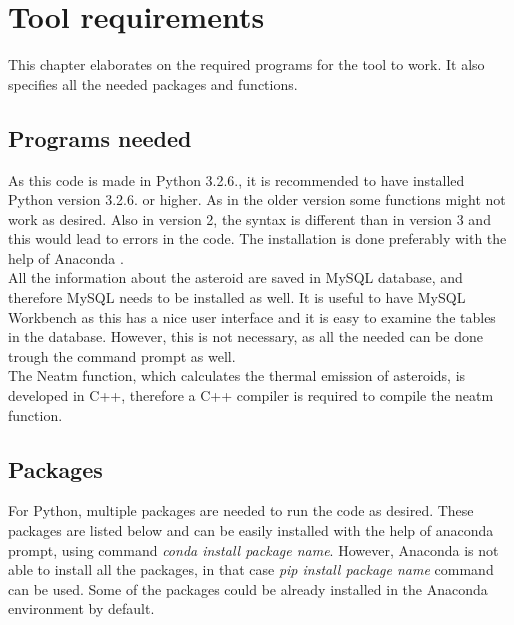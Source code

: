 
\chapter{Tool requirements}
\label{chap:2}

This chapter elaborates on the required programs for the tool to work. It also specifies all the needed packages and functions.

\section{Programs needed}
As this code is made in Python 3.2.6., it is recommended to have installed Python version 3.2.6. or higher. As in the older version some functions might not work as desired. Also in version 2, the syntax is different than in version 3 and this would lead to errors in the code. The installation is done preferably with the help of Anaconda \cite{anac}. \\

All the information about the asteroid are saved in MySQL database, and therefore MySQL \cite{mysql} needs to be installed as well. It is useful to have MySQL Workbench as this has a nice user interface and it is easy to examine the tables in the database. However, this is not necessary, as all the needed can be done trough the command prompt as well.\\

The Neatm function, which calculates the thermal emission of asteroids, is developed in C++, therefore a C++ compiler is required to compile the neatm function.

\section{Packages}
For Python, multiple packages are needed to run the code as desired. These packages are listed below and can be easily installed with the help of anaconda prompt, using command \textit{conda install package name}. However, Anaconda is not able to install all the packages, in that case \textit{pip install package name} command can be used. Some of the packages could be already installed in the Anaconda environment by default.

